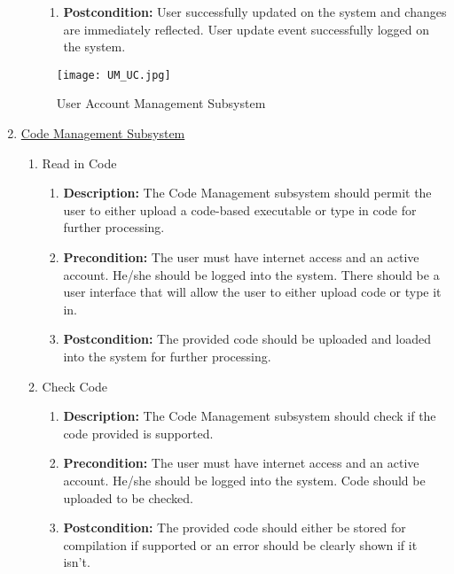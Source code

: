 \documentclass{article}
\begin{document}
\begin{enumerate}
\begin{enumerate}
\begin{enumerate}
			\item \textbf{Postcondition:} User successfully updated on the system and changes are immediately reflected. User update event successfully logged on the system.
\newline
		\end{enumerate}
	\end{enumerate}
    
     
        \begin{figure}[H]
    	\texttt{[image: UM\_UC.jpg]}
        \centering
		\caption{User Account Management Subsystem}	
	\end{figure}	
	
	
	\item \underline{Code Management Subsystem}
    \begin{enumerate}
    	\item Read in Code
		\begin{enumerate}
			\item \textbf{Description:} The Code Management subsystem should permit the user to either upload a code-based executable or type in code for further processing.
			\item \textbf{Precondition:} The user must have internet access and an active account. He/she should be logged into the system. There should be a user interface that will allow the user to either upload code or type it in.
			\item \textbf{Postcondition:} The provided code should be uploaded and loaded into the system for further processing.\newline
		\end{enumerate}
        
        \item Check Code
		\begin{enumerate}
			\item \textbf{Description:} The Code Management subsystem should check if the code provided is supported.
			\item \textbf{Precondition:} The user must have internet access and an active account. He/she should be logged into the system. Code should be uploaded to be checked.
			\item \textbf{Postcondition:} The provided code should either be stored for compilation if supported or an error should be clearly shown if it isn't.\newline
		\end{enumerate}
        

\end{enumerate}
\end{enumerate}
\end{document}
